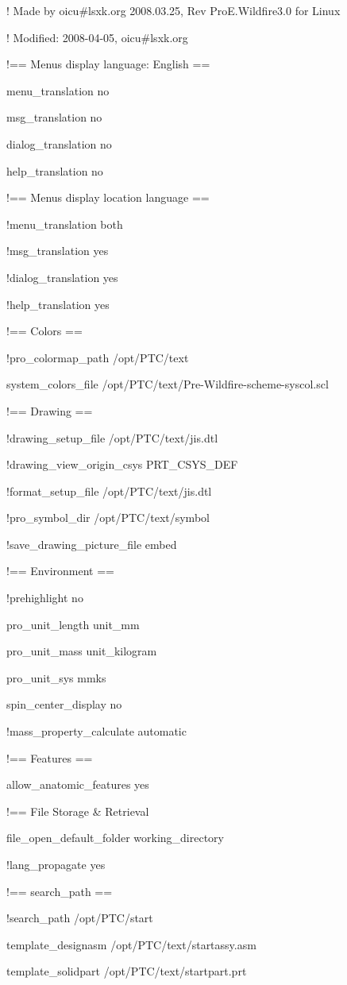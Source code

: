 ! Made by oicu\#lsxk.org 2008.03.25, Rev ProE.Wildfire3.0 for Linux

! Modified: 2008-04-05, oicu\#lsxk.org

!== Menus display language: English ==

menu\_translation no

msg\_translation no

dialog\_translation no

help\_translation no

!== Menus display location language ==

!menu\_translation both

!msg\_translation yes

!dialog\_translation yes

!help\_translation yes

!== Colors ==

!pro\_colormap\_path /opt/PTC/text

system\_colors\_file /opt/PTC/text/Pre-Wildfire-scheme-syscol.scl

!== Drawing ==

!drawing\_setup\_file /opt/PTC/text/jis.dtl

!drawing\_view\_origin\_csys PRT\_CSYS\_DEF

!format\_setup\_file /opt/PTC/text/jis.dtl

!pro\_symbol\_dir /opt/PTC/text/symbol

!save\_drawing\_picture\_file embed

!== Environment ==

!prehighlight no

pro\_unit\_length unit\_mm

pro\_unit\_mass unit\_kilogram

pro\_unit\_sys mmks

spin\_center\_display no

!mass\_property\_calculate automatic

!== Features ==

allow\_anatomic\_features yes

!== File Storage \& Retrieval

file\_open\_default\_folder working\_directory

!lang\_propagate yes

!== search\_path ==

!search\_path /opt/PTC/start

template\_designasm /opt/PTC/text/startassy.asm

template\_solidpart /opt/PTC/text/startpart.prt

